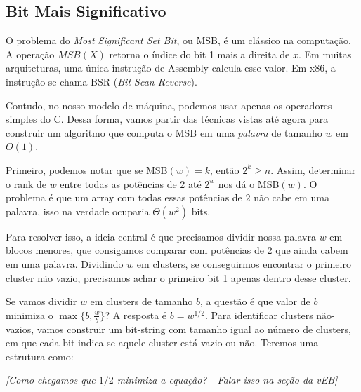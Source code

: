 \subsection{Bit Mais Significativo}

O problema do \textit{Most Significant Set Bit}, ou MSB, é um clássico na
computação. A operação $MSB(X)$ retorna o índice do bit 1 mais a direita de $x$.
Em muitas arquiteturas, uma única instrução de Assembly calcula esse valor. Em
x86, a instrução se chama BSR (\textit{Bit Scan Reverse}).

Contudo, no nosso modelo de máquina, podemos usar apenas os operadores simples
do C. Dessa forma, vamos partir das técnicas vistas até agora para construir um
algoritmo que computa o MSB em uma \textit{palavra} de tamanho $w$ em $O(1)$.

Primeiro, podemos notar que se MSB$(w) = k$, então $2^k\geq n$. Assim,
determinar o rank de $w$ entre todas as potências de 2 até $2^w$ nos dá o
MSB$(w)$. O problema é que um array com todas essas potências de $2$ não cabe em
uma palavra, isso na verdade ocuparia $\Theta(w^2)$ bits.

Para resolver isso, a ideia central é que precisamos dividir nossa palavra $w$
em blocos menores, que consigamos comparar com potências de $2$ que ainda cabem
em uma palavra. Dividindo $w$ em clusters, se conseguirmos encontrar o primeiro
cluster não vazio, precisamos achar o primeiro bit 1 apenas dentro desse
cluster.

Se vamos dividir $w$ em clusters de tamanho $b$, a questão é que valor de $b$
minimiza o $\max \{b,\frac{w}{b}\}$? A resposta é $b=w^{1/2}$. Para identificar
clusters não-vazios, vamos construir um bit-string com tamanho igual ao número
de clusters, em que cada bit indica se aquele cluster está vazio ou não. Teremos
uma estrutura como:

\textit{[Como chegamos que $1/2$ minimiza a equação? - Falar isso na seção da vEB]}

